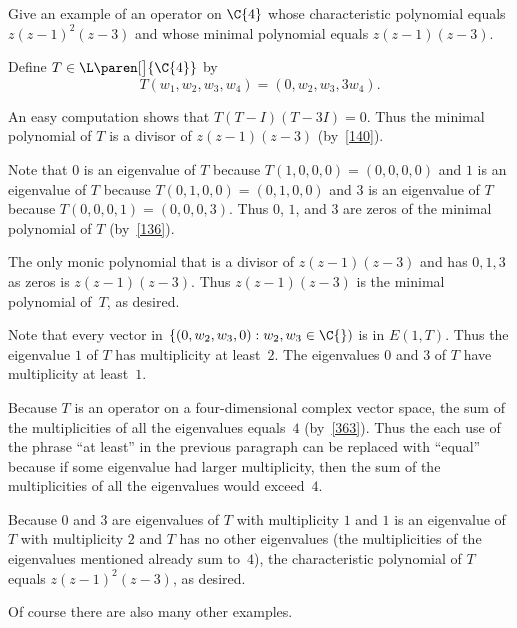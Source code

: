 \exercise
Give an example of an operator on $\C{4}$ whose characteristic
polynomial equals $z (z - 1)^2 (z - 3)$ and whose minimal polynomial equals
$z (z - 1) (z - 3)$.

\begin{Solution}
Define $T \in \L\paren[\big]{\C{4}}$ by
\[
T(w_1, w_2, w_3, w_4) = (0, w_2, w_3, 3w_4).
\]

An easy computation shows that $T(T - I)(T - 3I) = 0$.  Thus the minimal
polynomial of $T$ is a divisor of $z (z - 1) (z - 3)$ (by~\ref{140}).

Note that $0$ is an eigenvalue of $T$ because $T(1,0,0,0) = (0, 0, 0, 0)$ and $1$
is an eigenvalue of $T$ because $T(0,1,0,0) = (0,1,0,0)$ and $3$ is an eigenvalue
of $T$ because $T(0,0,0,1) = (0,0,0,3)$.  Thus $0$, $1$, and $3$ are zeros of
the minimal polynomial of $T$ (by~\ref{136}).

The only monic polynomial that is a divisor of $z (z - 1) (z - 3)$ and has
$0, 1, 3$ as zeros is $z (z - 1) (z - 3)$.  Thus $z (z - 1) (z - 3)$
is the minimal polynomial of~$T$, as desired.

Note that every vector in $\{(0, w_2, w_3, 0) : w_2, w_3 \in \C{})$ is in $E(1, T)$.  Thus the eigenvalue $1$
of $T$ has multiplicity at least~$2$.  The eigenvalues $0$ and $3$ of $T$ have
multiplicity at least~$1$.

Because $T$ is an operator on a
four-dimensional complex vector space, the sum of the multiplicities of all the
eigenvalues equals~$4$ (by~\ref{363}).  Thus the each use of the phrase ``at
least'' in the previous paragraph can be replaced with ``equal'' because if some eigenvalue had larger multiplicity, then the sum of the multiplicities of all the
eigenvalues would exceed~$4$.

Because $0$ and $3$ are eigenvalues of $T$ with multiplicity $1$ and $1$ is an
eigenvalue of $T$ with multiplicity $2$ and $T$ has no other eigenvalues (the
multiplicities of the eigenvalues mentioned already sum to~$4$), the characteristic
polynomial of $T$ equals $z(z-1)^2(z-3)$, as desired.

Of course there are also many other examples.
\end{Solution}

